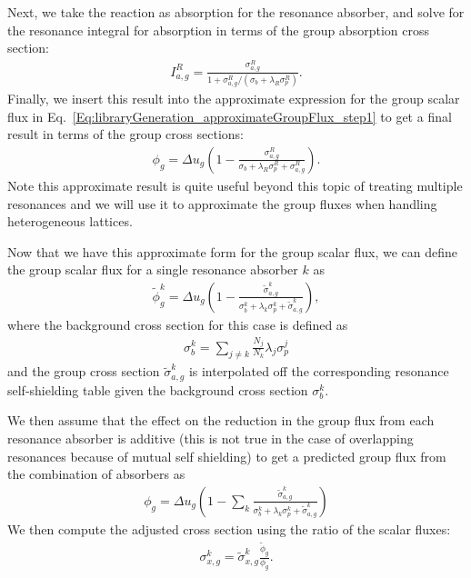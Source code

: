 Next, we take the reaction as absorption for the resonance absorber, and solve for the resonance integral for absorption in terms of the group absorption cross section:
\begin{align}
  I_{a,g}^R = \frac{ \sigma_{a,g}^R }{ 1 + \sigma_{a,g}^R /( \sigma_b + \lambda_R \sigma_p^R ) } .
\end{align}
Finally, we insert this result into the approximate expression for the group scalar flux in Eq.~\eqref{Eq:libraryGeneration_approximateGroupFlux_step1} to get a final result in terms of the group cross sections:
\begin{align}
  \phi_g = \Delta u_g \left( 1 - \frac{ \sigma_{a,g}^R }{ \sigma_b + \lambda_R \sigma_p^R + \sigma_{a,g}^R } \right) . \label{Eq:libraryGeneration_approximateGroupFlux} 
\end{align}
Note this approximate result is quite useful beyond this topic of treating multiple resonances and we will use it to approximate the group fluxes when handling heterogeneous lattices.

Now that we have this approximate form for the group scalar flux, we can define the group scalar flux for a single resonance absorber $k$ as
\begin{align}
  \widetilde{\phi}_g^k = \Delta u_g \left( 1 - \frac{ \widetilde{\sigma}_{a,g}^k }{ \sigma_b^k + \lambda_k \sigma_p^k + \widetilde{\sigma}_{a,g}^k } \right) ,
\end{align}
where the background cross section for this case is defined as
\begin{align}
  \sigma_b^k = \sum_{j \ne k} \frac{N_j}{N_k} \lambda_j \sigma_p^j 
\end{align}
and the group cross section $\widetilde{\sigma}_{a,g}^k$ is interpolated off the corresponding resonance self-shielding table given the background cross section $\sigma_b^k$.

We then assume that the effect on the reduction in the group flux from each resonance absorber is additive (this is not true in the case of overlapping resonances because of mutual self shielding) to get a predicted group flux from the combination of absorbers as
\begin{align}
  \phi_g =  \Delta u_g \left( 1 - \sum_k \frac{ \widetilde{\sigma}_{a,g}^k }{ \sigma_b^k + \lambda_k \sigma_p^k + \widetilde{\sigma}_{a,g}^k } \right) 
\end{align}
We then compute the adjusted cross section using the ratio of the scalar fluxes:
\begin{align}
  \sigma_{x,g}^k = \widetilde{\sigma}_{x,g}^k \frac{ \widetilde{\phi}_g }{ \phi_g } .
\end{align}





